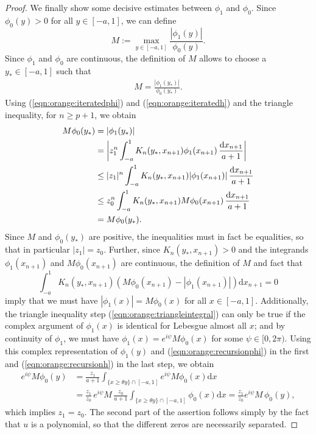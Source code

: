 \documentclass[12pt]{article}
\newcommand{\1}{\mathds{1}}
\renewcommand{\d}{\mathrm{d}}
\theoremstyle{definition}
\theoremstyle{plain}
\theoremstyle{remark}
\begin{document}
\begin{proof}
We finally show some decisive estimates between $\phi_1$ and $\phi_0$. Since $\phi_0(y)>0$ for all $y\in[-a,1]$, we can define
$$
M:=\max_{y\in[-a,1]} \frac{|\phi_1(y)|}{\phi_0(y)}.
$$
Since $\phi_1$ and $\phi_0$ are continuous, the definition of $M$ allows to choose a $y_\ast\in[-a,1]$ such that
\begin{align*}
M = \frac{|\phi_1(y_\ast)|}{\phi_0(y_\ast)}.
\end{align*}
Using (\ref{eqn:orange:iteratedphi}) and (\ref{eqn:orange:iteratedh}) and the triangle inequality, for $n\geq p+1$, we obtain
\begin{align}
M \phi_0(y_\ast) & = |\phi_1(y_\ast)| \notag
\\
& = \left|z_1 ^n \int_{-a}^1 K_n(y_\ast,x_{n+1}) \phi_1(x_{n+1}) \,\frac{\d x_{n+1}}{a+1} \right| \notag 
\\
&  \leq |z_1|^n \int_{-a}^1 K_n(y_\ast,x_{n+1}) |\phi_1(x_{n+1})| \, \frac{\d x_{n+1}}{a+1} \label{eqn:orange:triangleintegral}
\\
& \leq z_0^n  \int_{-a}^1 K_n(y_\ast,x_{n+1}) M \phi_0(x_{n+1}) \, \frac{\d x_{n+1}}{a+1} \notag
\\
& = M \phi_0(y_\ast). \notag
\end{align}
Since $M$ and $\phi_0(y_\ast)$ are positive, the inequalities must in fact be equalities, so that in particular $|z_1|=z_0$. Further, since $K_n(y_\ast,x_{n+1})>0$ and the integrands $\phi_1(x_{n+1})$ and $ M \phi_0(x_{n+1})$ are continuous, the definition of $M$ and fact that
$$
\int_{-a}^1 K_n(y_\ast,x_{n+1}) (M \phi_0(x_{n+1})- |\phi_1(x_{n+1})|) \d x_{n+1} = 0
$$
imply that we must have $|\phi_1(x)|=M \phi_0(x)$ for all $x\in[-a,1]$. Additionally, the triangle inequality step (\ref{eqn:orange:triangleintegral}) can only be true if the complex argument of $\phi_1(x)$ is identical for Lebesgue almost all $x$; and by continuity of $\phi_1$, we must have $\phi_1(x)=e^{i\psi} M \phi_0(x)$ for some $\psi\in[0,2\pi)$.
Using this complex representation of $\phi_1(y)$ and (\ref{eqn:orange:recursionphi}) in the first and   (\ref{eqn:orange:recursionh}) in the last step, we obtain
\begin{align*}
e^{i\psi} M \phi_0(y) & = \frac{z_1}{a+1} \int_{\{x\geq \theta y\}\cap[-a,1]}  e^{i\psi} M \phi_0(x) \d x 
\\
& =  \frac{z_1}{z_0} \, e^{i\psi} M\, \frac{z_0}{a+1} \int_{\{x\geq \theta y\}\cap[-a,1]}  \phi_0(x) \d x =  \frac{z_1}{z_0} e^{i\psi} M\, \phi_0(y),
\end{align*}
which implies $z_1=z_0$. The second part of the assertion follows simply by the fact that $u$ is a polynomial, so that the different zeros are necessarily separated.
\end{proof}
\end{document}
